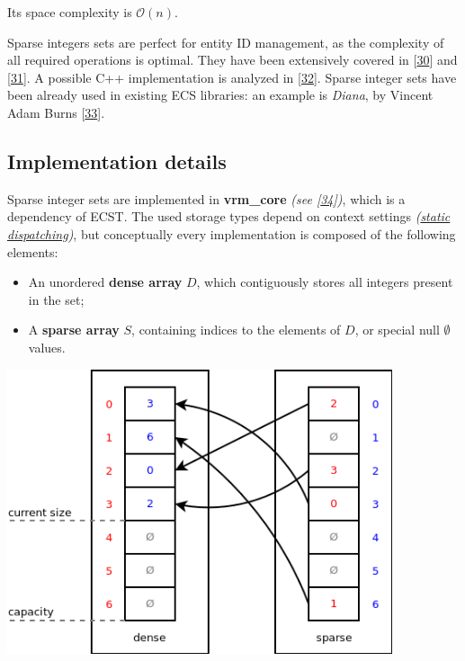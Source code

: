 \documentclass[oneside, 12pt, a4paper, openany]{book}
\let\origfigure=\figure
\let\endorigfigure=\endfigure
\renewenvironment{figure}[1][]{%
\origfigure[H]
}{%
\endorigfigure
}
\begin{document}
Its space complexity is \(\mathcal{O}(n)\).

Sparse integers sets are perfect for entity ID management, as the
complexity of all required operations is optimal. They have been
extensively covered in {[}\protect\hyperlink{ref-sparsesets132}{30}{]}
and {[}\protect\hyperlink{ref-sparsesets_praxis}{31}{]}. A possible C++
implementation is analyzed in
{[}\protect\hyperlink{ref-sparsesets_cpp}{32}{]}. Sparse integer sets
have been already used in existing ECS libraries: an example is
\emph{Diana}, by Vincent Adam Burns
{[}\protect\hyperlink{ref-github_diana}{33}{]}.

\subsection{Implementation details}\label{implementation-details-4}

Sparse integer sets are implemented in \textbf{vrm\_core} \emph{(see
{[}\protect\hyperlink{ref-github_vrmcore}{34}{]})}, which is a
dependency of ECST. The used storage types depend on context settings
\emph{(\protect\hyperlink{appendix_static_dispatching}{static
dispatching})}, but conceptually every implementation is composed of the
following elements:

\begin{itemize}
\item
  An unordered \textbf{dense array} \(D\), which contiguously stores all
  integers present in the set;
\item
  A \textbf{sparse array} \(S\), containing indices to the elements of
  \(D\), or special null \(\emptyset\) values.
\end{itemize}

\begin{figure}[htbp]
\centering
\includegraphics[width=0.85000\textwidth]{source/figures/sparseset.png}
\caption{ECST miscellaneous: fixed sparse integer set
example}\label{sparsesetexample}
\end{figure}
\end{document}

